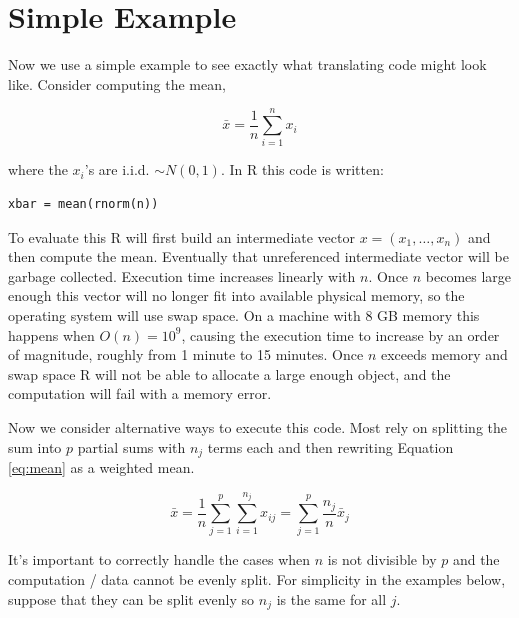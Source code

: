 \documentclass[12pt]{article}
\begin{document}
\section{Simple Example}


Now we use a simple example to see exactly what translating code might look
like.  Consider computing the mean,

\begin{equation}
    \bar{x} = \frac{1}{n} \sum_{i = 1}^n x_i
\label{eq:mean}
\end{equation}

where the $x_i$'s are
i.i.d. $\sim N(0, 1)$.  In R this code is written:

\begin{verbatim}
xbar = mean(rnorm(n))
\end{verbatim}

To evaluate this R will first build an intermediate vector $x = (x_1,
\dots, x_n)$ and then compute the mean. Eventually that unreferenced
intermediate vector will be garbage collected.
Execution time increases
linearly with $n$. Once $n$ becomes large
enough this vector will no longer fit into available physical memory, so
the operating system will use swap space. On a machine with 8 GB memory
this happens when $O(n) = 10^9$, causing the execution time
to increase by an order of magnitude, roughly from 1 minute to 15
minutes. Once $n$ exceeds memory and swap space R will not be able to allocate a
large enough object, and the computation will fail with a memory error.

Now we consider alternative ways to execute this code.  Most rely on
splitting the sum into $p$ partial sums with $n_j$ terms each and then rewriting
Equation \ref{eq:mean} as a weighted mean.

\begin{equation}
    \bar{x} = \frac{1}{n} \sum_{j = 1}^p \sum_{i = 1}^{n_j} x_{ij}
    = \sum_{j = 1}^p \frac{n_j}{n} \bar{x}_j
\label{eq:mean_partial}
\end{equation}

It's important to correctly handle the cases when $n$ is not divisible by $p$
and the computation / data cannot be evenly split. For simplicity in the
examples below, suppose that they can be split evenly so $n_j$ is the same
for all $j$.
\end{document}
